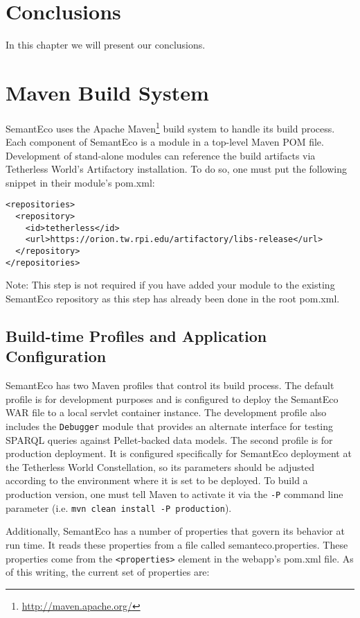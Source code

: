 \documentclass[letterpaper]{report}
\begin{document}
\chapter{Conclusions}
In this chapter we will present our conclusions.

\appendix
\chapter{Maven Build System}
SemantEco uses the Apache Maven\footnote{\url{http://maven.apache.org/}} build system to handle its build process. Each component of SemantEco is a module in a top-level Maven POM file. Development of stand-alone modules can reference the build artifacts via Tetherless World's Artifactory installation. To do so, one must put the following snippet in their module's pom.xml:

\begin{lstlisting}
<repositories>
  <repository>
    <id>tetherless</id>
    <url>https://orion.tw.rpi.edu/artifactory/libs-release</url>
  </repository>
</repositories>
\end{lstlisting}

\noindent Note: This step is not required if you have added your module to the existing SemantEco repository as this step has already been done in the root pom.xml.

\section{Build-time Profiles and Application Configuration}
SemantEco has two Maven profiles that control its build process. The default profile is for development purposes and is configured to deploy the SemantEco WAR file to a local servlet container instance. The development profile also includes the \texttt{Debugger} module that provides an alternate interface for testing SPARQL queries against Pellet-backed data models. The second profile is for production deployment. It is configured specifically for SemantEco deployment at the Tetherless World Constellation, so its parameters should be adjusted according to the environment where it is set to be deployed. To build a production version, one must tell Maven to activate it via the \texttt{-P} command line parameter (i.e. \texttt{mvn clean install -P production}).

Additionally, SemantEco has a number of properties that govern its behavior at run time. It reads these properties from a file called semanteco.properties. These properties come from the \texttt{<properties>} element in the webapp's pom.xml file. As of this writing, the current set of properties are:
\end{document}
